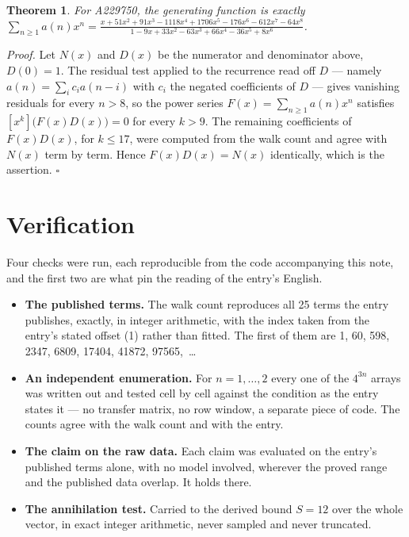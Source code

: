 \documentclass[11pt]{article}
\newtheorem{theorem}{Theorem}
\theoremstyle{definition}
\begin{document}
\begin{theorem} For A229750, the generating function is exactly $\sum_{n\ge 1} a(n)x^n = \frac{x + 51x^{2} + 91x^{3} - 1118x^{4} + 1706x^{5} - 176x^{6} - 612x^{7} - 64x^{8}}{1 - 9x + 33x^{2} - 63x^{3} + 66x^{4} - 36x^{5} + 8x^{6}}$.\end{theorem}

{\itshape Proof.} Let $N(x)$ and $D(x)$ be the numerator and denominator above, $D(0)=1$. The residual test applied to the recurrence read off $D$ --- namely $a(n) = \sum_i c_i a(n-i)$ with $c_i$ the negated coefficients of $D$ --- gives vanishing residuals for every $n > 8$, so the power series $F(x)=\sum_{n\ge 1}a(n)x^n$ satisfies $[x^k]\bigl(F(x)D(x)\bigr) = 0$ for every $k > 9$. The remaining coefficients of $F(x)D(x)$, for $k \le 17$, were computed from the walk count and agree with $N(x)$ term by term. Hence $F(x)D(x) = N(x)$ identically, which is the assertion. $\square$

\section{Verification}

Four checks were run, each reproducible from the code accompanying this note, and the first two are what pin the reading of the entry's English.

\begin{itemize}

\item {\bfseries The published terms.} The walk count reproduces all 25 terms the entry publishes, exactly, in integer arithmetic, with the index taken from the entry's stated offset (1) rather than fitted. The first of them are 1, 60, 598, 2347, 6809, 17404, 41872, 97565,~\dots

\item {\bfseries An independent enumeration.} For $n = 1,\dots,2$ every one of the $4^{3n}$ arrays was written out and tested cell by cell against the condition as the entry states it --- no transfer matrix, no row window, a separate piece of code. The counts agree with the walk count and with the entry.

\item {\bfseries The claim on the raw data.} Each claim was evaluated on the entry's published terms alone, with no model involved, wherever the proved range and the published data overlap. It holds there.

\item {\bfseries The annihilation test.} Carried to the derived bound $S = 12$ over the whole vector, in exact integer arithmetic, never sampled and never truncated.

\end{itemize}
\end{document}
